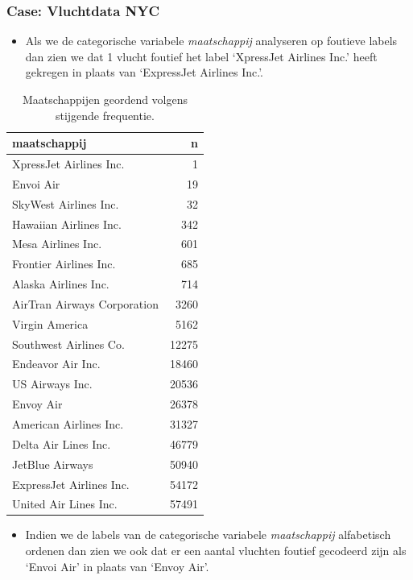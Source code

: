 \documentclass[]{tufte-book}
\providecommand{\tightlist}{%
  \setlength{\itemsep}{0pt}\setlength{\parskip}{0pt}}
\begin{document}
\hypertarget{case-vluchtdata-nyc}{%
\subsubsection*{Case: Vluchtdata NYC}\label{case-vluchtdata-nyc}}

\begin{itemize}
\tightlist
\item
  Als we de categorische variabele \emph{maatschappij} analyseren op foutieve labels dan zien we dat 1 vlucht foutief het label `XpressJet Airlines Inc.' heeft gekregen in plaats van `ExpressJet Airlines Inc.'.
\end{itemize}

\begin{table}

\caption{\label{tab:5-5b}Maatschappijen geordend volgens stijgende frequentie.}
\centering
\fontsize{10}{12}\selectfont
\begin{tabular}[t]{lr}
\toprule
maatschappij & n\\
\midrule
XpressJet Airlines Inc. & 1\\
Envoi Air & 19\\
SkyWest Airlines Inc. & 32\\
Hawaiian Airlines Inc. & 342\\
Mesa Airlines Inc. & 601\\
\addlinespace
Frontier Airlines Inc. & 685\\
Alaska Airlines Inc. & 714\\
AirTran Airways Corporation & 3260\\
Virgin America & 5162\\
Southwest Airlines Co. & 12275\\
\addlinespace
Endeavor Air Inc. & 18460\\
US Airways Inc. & 20536\\
Envoy Air & 26378\\
American Airlines Inc. & 31327\\
Delta Air Lines Inc. & 46779\\
\addlinespace
JetBlue Airways & 50940\\
ExpressJet Airlines Inc. & 54172\\
United Air Lines Inc. & 57491\\
\bottomrule
\end{tabular}
\end{table}

\begin{itemize}
\tightlist
\item
  Indien we de labels van de categorische variabele \emph{maatschappij} alfabetisch ordenen dan zien we ook dat er een aantal vluchten foutief gecodeerd zijn als `Envoi Air' in plaats van `Envoy Air'.
\end{itemize}
\end{document}
